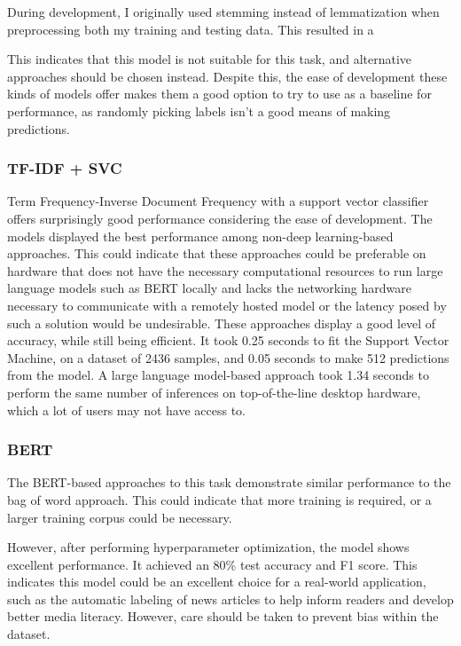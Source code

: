 \documentclass[twocolumn]{article}
\begin{document}
During development, I originally used stemming instead of lemmatization when preprocessing both my training and testing data. This resulted in a 

This indicates that this model is not suitable for this task, and alternative approaches should be chosen instead. Despite this, the ease of development these kinds of models offer makes them a good option to try to use as a baseline for performance, as randomly picking labels isn't a good means of making predictions. 

\subsubsection{TF-IDF + SVC}

Term Frequency-Inverse Document Frequency with a support vector classifier offers surprisingly good performance considering the ease of development. The models displayed the best performance among non-deep learning-based approaches. This could indicate that these approaches could be preferable on hardware that does not have the necessary computational resources to run large language models such as BERT locally and lacks the networking hardware necessary to communicate with a remotely hosted model or the latency posed by such a solution would be undesirable. These approaches display a good level of accuracy, while still being efficient. It took 0.25 seconds to fit the Support Vector Machine, on a dataset of 2436 samples, and 0.05 seconds to make 512 predictions from the model. A large language model-based approach took 1.34 seconds to perform the same number of inferences on top-of-the-line desktop hardware, which a lot of users may not have access to. 

\subsubsection{BERT}

The BERT-based approaches to this task demonstrate similar performance to the bag of word approach. This could indicate that more training is required, or a larger training corpus could be necessary. 

However, after performing hyperparameter optimization, the model shows excellent performance. It achieved an 80\% test accuracy and F1 score. This indicates this model could be an excellent choice for a real-world application, such as the automatic labeling of news articles to help inform readers and develop better media literacy. However, care should be taken to prevent bias within the dataset. 
\end{document}
